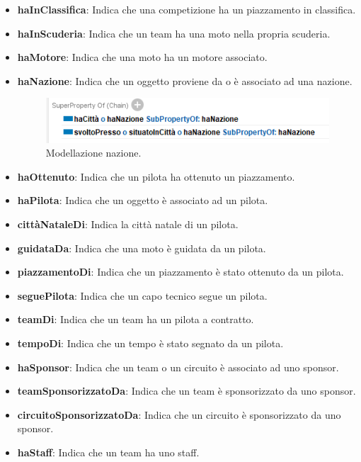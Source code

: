 \begin{itemize}
    \item \textbf{haInClassifica}: Indica che una competizione ha un piazzamento in classifica.
    \item \textbf{haInScuderia}: Indica che un team ha una moto nella propria scuderia.
    \item \textbf{haMotore}: Indica che una moto ha un motore associato.
    \item \textbf{haNazione}: Indica che un oggetto proviene da o è associato ad una nazione.
      \begin{figure}[H]
    \begin{center}
        \includegraphics[scale=1]{img/spec_haNazione.png}
       \caption{Modellazione nazione.} 
    \end{center}
\end{figure}
    \item \textbf{haOttenuto}: Indica che un pilota ha ottenuto un piazzamento.
	
    \item \textbf{haPilota}: Indica che un oggetto è associato ad un pilota.
    \item \textbf{cittàNataleDi}: Indica la città natale di un pilota.
    \item \textbf{guidataDa}: Indica che una moto è guidata da un pilota.
    \item \textbf{piazzamentoDi}: Indica che un piazzamento è stato ottenuto da un pilota.
    \item \textbf{seguePilota}: Indica che un capo tecnico segue un pilota.
    \item \textbf{teamDi}: Indica che un team ha un pilota a contratto.
    \item \textbf{tempoDi}: Indica che un tempo è stato segnato da un pilota.
	
    \item \textbf{haSponsor}: Indica che un team o un circuito è associato ad uno sponsor.
    \item \textbf{teamSponsorizzatoDa}: Indica che un team è sponsorizzato da uno sponsor.
    \item \textbf{circuitoSponsorizzatoDa}: Indica che un circuito è sponsorizzato da uno sponsor.
	
    \item \textbf{haStaff}: Indica che un team ha uno staff.
	

\end{itemize}
